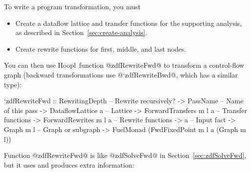 \documentclass[blockstyle,preprint,natbib,nocopyrightspace]{sigplanconf}
\newcommand\ourlib{Hoopl}  %
\newcommand\secref[1]{Section~\ref{sec:#1}}
\newcommand\seclabel[1]{\label{sec:#1}}
\begin{document}
To write a program transformation,
you must 
\begin{itemize}
\item
Create a dataflow lattice and transfer functions for the supporting
analysis, as described in \secref{create-analysis}. 
\item
Create rewrite functions for first, middle, and last nodes.
\end{itemize}
You can then use \ourlib\ function @zdfRewriteFwd@ to transform a
control-flow graph (backward transformations use @`zdfRewriteBwd@,
which has a similar type):
\begin{code}
 `zdfRewriteFwd 
  :: RewritingDepth         -- Rewrite recursively?
  -> PassName               -- Name of this pass
  -> DataflowLattice a      -- Lattice
  -> ForwardTransfers m l a -- Transfer functions
  -> ForwardRewrites  m l a -- Rewrite functions
  -> a                      -- Input fact
  -> Graph m l              -- Graph or subgraph
  -> FuelMonad (FwdFixedPoint m l a (Graph m l))
\end{code}
Function @zdfRewriteFwd@ is like @zdfSolveFwd@ in
\secref{zdfSolveFwd}, but it uses and produces extra
information:\seclabel{engine-truth} 
\end{document}

